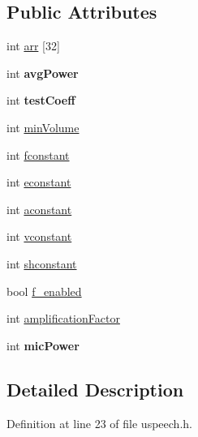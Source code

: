 \subsection*{Public Attributes}
\begin{DoxyCompactItemize}
\item 
int \hyperlink{classsignal_a3e2d5027e6570321f8d1a823b0d47af0}{arr} \mbox{[}32\mbox{]}
\item 
\hypertarget{classsignal_ab32b590e3f68d6365187bfc2548e9a45}{int {\bfseries avg\-Power}}\label{classsignal_ab32b590e3f68d6365187bfc2548e9a45}

\item 
\hypertarget{classsignal_aeaf455f095f4d8f60aac5d0b7ba4cbf6}{int {\bfseries test\-Coeff}}\label{classsignal_aeaf455f095f4d8f60aac5d0b7ba4cbf6}

\item 
int \hyperlink{classsignal_a4604a8a9760752f00af96457a34debf9}{min\-Volume}
\item 
int \hyperlink{classsignal_ae256fa87a2b25841cda3155d0519172c}{fconstant}
\item 
int \hyperlink{classsignal_aa346a5acfecf429893ab85bc4a903875}{econstant}
\item 
int \hyperlink{classsignal_ad300e73d67f1870bbbc5cfcece5910ec}{aconstant}
\item 
int \hyperlink{classsignal_ad717d6555e102392063d04affb78b95d}{vconstant}
\item 
int \hyperlink{classsignal_a6697308a69e450ec5322b8438a442b36}{shconstant}
\item 
bool \hyperlink{classsignal_aaecf78836054e8f13a6caaf340d0b3c9}{f\-\_\-enabled}
\item 
int \hyperlink{classsignal_a16d895fcf95efa3327fd7342f7bde145}{amplification\-Factor}
\item 
\hypertarget{classsignal_ab8922a2b87023df6deab895d1dcccdc9}{int {\bfseries mic\-Power}}\label{classsignal_ab8922a2b87023df6deab895d1dcccdc9}

\end{DoxyCompactItemize}


\subsection{Detailed Description}


Definition at line 23 of file uspeech.\-h.



